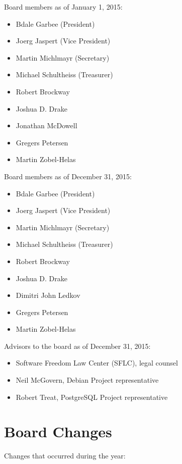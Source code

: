\documentclass[letterpaper]{report}
\begin{document}
Board members as of January 1, 2015:

\begin{itemize}
\item Bdale Garbee (President)
\item Joerg Jaspert (Vice President)
\item Martin Michlmayr (Secretary)
\item Michael Schultheiss (Treasurer)
\item Robert Brockway
\item Joshua D. Drake
\item Jonathan McDowell
\item Gregers Petersen
\item Martin Zobel-Helas
\end{itemize}

Board members as of December 31, 2015:

\begin{itemize}
\item Bdale Garbee (President)
\item Joerg Jaspert (Vice President)
\item Martin Michlmayr (Secretary)
\item Michael Schultheiss (Treasurer)
\item Robert Brockway
\item Joshua D. Drake
\item Dimitri John Ledkov
\item Gregers Petersen
\item Martin Zobel-Helas
\end{itemize}

Advisors to the board as of December 31, 2015:

\begin{itemize}
\item Software Freedom Law Center (SFLC), legal counsel
\item Neil McGovern, Debian Project representative
\item Robert Treat, PostgreSQL Project representative
\end{itemize}

\section{Board Changes}

Changes that occurred during the year:
\end{document}
